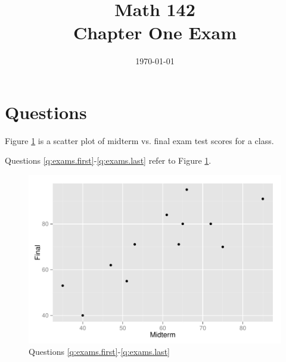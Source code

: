 \documentclass[letterpaper]{exam}
\title{Math 142 \\ Chapter One Exam}
\date{\today}
\author{}
\begin{document}
  \maketitle

  \begin{center}
    \gradetable[h][pages]
  \end{center}

  \section{Questions}

  Figure \ref{fig:exams} is a scatter plot of midterm vs. final exam test scores
  for a class.

  Questions \ref{q:exams.first}-\ref{q:exams.last} refer to Figure \ref{fig:exams}.  

  \begin{figure}[H]
    \centering
    \includegraphics[scale = 0.5]{figures/exams_scatter.pdf}
    \caption{Questions \ref{q:exams.first}-\ref{q:exams.last}}
    \label{fig:exams}
  \end{figure}
\end{document}
